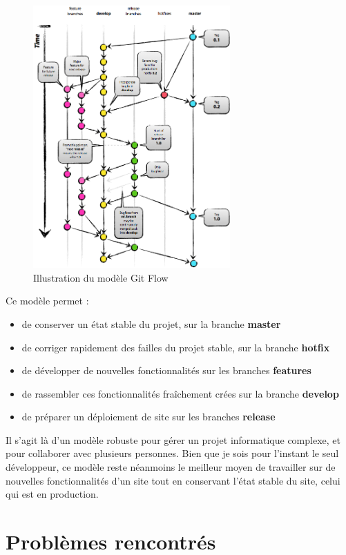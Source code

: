 \documentclass[a4paper,french,11pt,openany,oneside]{memoir}
\begin{document}
\begin{center}
\begin{figure}[ht]
\centering
     \includegraphics[width=285px]{img/gitflow}
      \caption{Illustration du modèle \og Git Flow \fg }
\end{figure}
\end{center}

Ce modèle permet :

\begin{itemize}
	\item de conserver un état stable du projet, sur la branche \textbf{master}
	\item de corriger rapidement des failles du projet stable, sur la branche \textbf{hotfix}
	\item de développer de nouvelles fonctionnalités sur les branches \textbf{features}
	\item de rassembler ces fonctionnalités fraîchement crées sur la branche \textbf{develop}
	\item de préparer un déploiement de site sur les branches \textbf{release}
\end{itemize}



Il s'agit là d'un modèle robuste pour gérer un projet informatique complexe, et pour collaborer avec plusieurs personnes. Bien que je sois pour l'instant le seul développeur, ce modèle reste néanmoins le meilleur moyen de travailler sur de nouvelles fonctionnalités d'un site tout en conservant l'état stable du site, celui qui est en production.


\section{Problèmes rencontrés}
\end{document}
